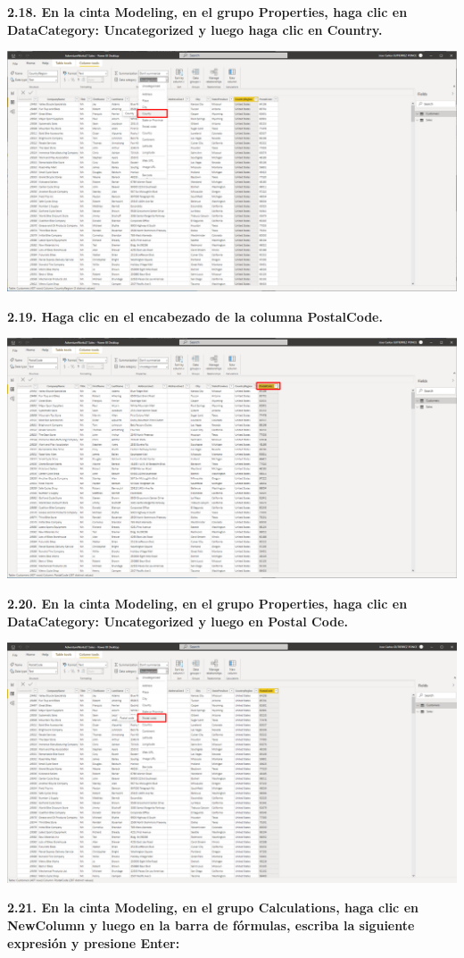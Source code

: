 \documentclass{article}
\begin{document}
\textbf{2.18. En la cinta \textbf{Modeling}, en el grupo \textbf{Properties}, haga clic en \textbf{DataCategory: Uncategorized} y luego haga clic en \textbf{Country}.}

    \begin{center}
		\includegraphics[width=14cm]{./images/31} 
	\end{center}
\newpage	
\textbf{2.19. Haga clic en el encabezado de la columna \textbf{PostalCode}.}

    \begin{center}
		\includegraphics[width=14cm]{./images/32} 
	\end{center}
	
\textbf{2.20. En la cinta \textbf{Modeling}, en el grupo \textbf{Properties}, haga clic en \textbf{DataCategory: Uncategorized} y luego en \textbf{Postal Code}.}

    \begin{center}
		\includegraphics[width=14cm]{./images/33} 
	\end{center}
\newpage	
\textbf{2.21. En la cinta \textbf{Modeling}, en el grupo \textbf{Calculations}, haga clic en \textbf{NewColumn} y luego en la barra de fórmulas, escriba la siguiente expresión y presione Enter:}
\end{document}
